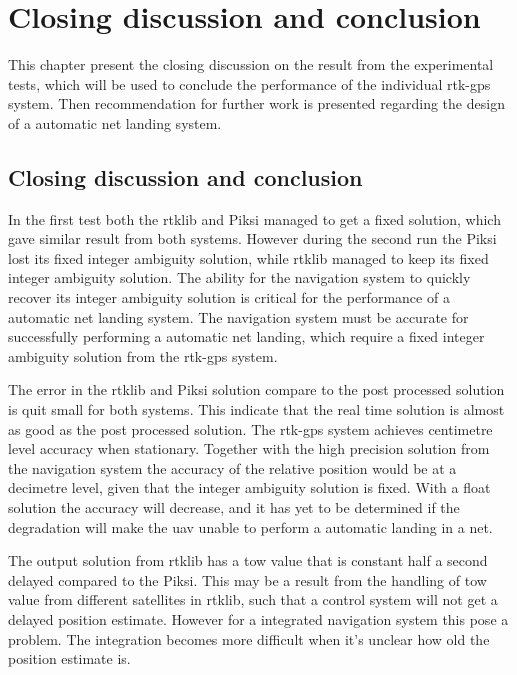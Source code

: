 
\chapter{Closing discussion and conclusion}
This chapter present the closing discussion on the result from the experimental tests, which will be used to conclude the performance of the individual \gls{rtk-gps} system. Then recommendation for further work is presented regarding the design of a automatic net landing system.
\section{Closing discussion and conclusion}
In the first test both the \gls{rtklib} and Piksi managed to get a fixed solution, which gave similar result from both systems. However during the second run the Piksi lost its fixed integer ambiguity solution, while \gls{rtklib} managed to keep its fixed integer ambiguity solution. The ability for the navigation system to quickly recover its integer ambiguity solution is critical for the performance of a automatic net landing system. The navigation system must be accurate  for successfully performing a automatic net landing, which require a fixed integer ambiguity solution from the \gls{rtk-gps} system.

The error in the \gls{rtklib} and Piksi solution compare to the post processed solution is quit small for both systems. This indicate that the real time solution is almost as good as the post processed solution.
The \gls{rtk-gps} system achieves centimetre level accuracy when stationary. Together with the high precision solution from the navigation system the accuracy of the relative position would be at a decimetre level, given that the integer ambiguity solution is fixed. With a float solution the accuracy will decrease, and it has yet to be determined if the degradation will make the \gls{uav} unable to perform a automatic landing in a net.

The output solution from \gls{rtklib} has a \acrfull{tow} value that is constant half a second delayed compared to the Piksi. This may be a result from the handling of \gls{tow} value from different satellites in \gls{rtklib}, such that a control system will not get a delayed position estimate. However for a integrated navigation system this pose a problem. The integration becomes more difficult when it's unclear how old the position estimate is.

